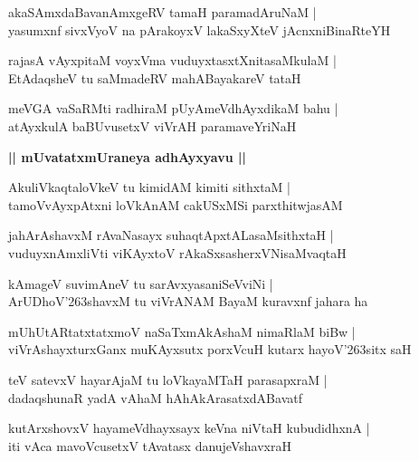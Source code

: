 \documentclass[twoside,12pt,openright]{book}
\def\S{\char'263}
\newcounter{shloka}[chapter]
\def\uvaca#1{\centerline{{\large\textbf{#1}}}}
\begin{document}
\begin{shloka}%
akaSAmxdaBavanAmxgeRV tamaH paramadAruNaM |\\
yasumxnf sivxVyoV na pArakoyxV lakaSxyXteV jAcnxniBinaRteYH 
\end{shloka}

\begin{shloka}%
rajasA vAyxpitaM voyxVma vuduyxtasxtXnitasaMkulaM |\\
EtAdaqsheV tu saMmadeRV mahABayakareV tataH 
\end{shloka}

\begin{shloka}%
meVGA vaSaRMti radhiraM pUyAmeVdhAyxdikaM bahu |\\
atAyxkulA baBUvusetxV viVrAH paramaveYriNaH 
\end{shloka}

\uvaca{|| mUvatatxmUraneya adhAyxyavu ||}

\begin{shloka}%
AkuliVkaqtaloVkeV tu kimidAM kimiti sithxtaM |\\
tamoVvAyxpAtxni loVkAnAM cakUSxMSi parxthitwjasAM 
\end{shloka}

\begin{shloka}%
jahArAshavxM rAvaNasayx suhaqtApxtALasaMsithxtaH |\\
vuduyxnAmxliVti viKAyxtoV rAkaSxsasherxVNisaMvaqtaH 
\end{shloka}

\begin{shloka}%
kAmageV suvimAneV tu sarAvxyasaniSeVviNi |\\
ArUDhoV\S shavxM tu viVrANAM BayaM kuravxnf jahara ha 
\end{shloka}

\begin{shloka}%
mUhUtARtatxtatxmoV naSaTxmAkAshaM nimaRlaM biBw |\\
viVrAshayxturxGanx muKAyxsutx porxVcuH kutarx hayoV\S sitx saH 
\end{shloka}

\begin{shloka}%
teV satevxV hayarAjaM tu loVkayaMTaH parasapxraM |\\
dadaqshunaR yadA vAhaM hAhAkArasatxdABavatf
\end{shloka}

\begin{shloka}%
kutArxshovxV hayameVdhayxsayx keVna niVtaH kubudidhxnA |\\
iti vAca mavoVcusetxV tAvatasx danujeVshavxraH 
\end{shloka}
\end{document}

